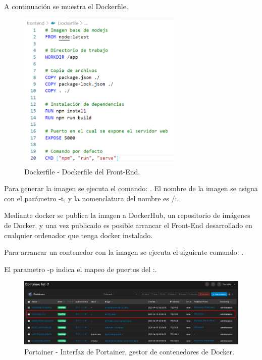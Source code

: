\bigskip

A continuación se muestra el Dockerfile.

\bigskip

\begin{figure}[H]
        \centering
        \includegraphics[width=0.7\textwidth]{img/capturas/Dockerfile.png}
        \caption{Dockerfile - Dockerfile del Front-End.}
        \label{fig:configApi}
\end{figure}

\bigskip

Para generar la imagen se ejecuta el comando: . El nombre de la imagen se asigna con el parámetro -t, y la nomenclatura del nombre es  /:.

\bigskip

Mediante docker se publica la imagen a DockerHub, un repositorio de imágenes de Docker, y una vez publicado es posible arrancar el Front-End desarrollado en cualquier ordenador que tenga docker instalado.

\bigskip

Para arrancar un contenedor con la imagen se ejecuta el siguiente comando: .

\bigskip

El parametro -p indica el mapeo de puertos del :.

\begin{figure}[H]
        \centering
        \includegraphics[width=1\textwidth]{img/capturas/portainertfg.png}
        \caption{Portainer - Interfaz de Portainer, gestor de contenedores de Docker.}
        \label{fig:configApi}
\end{figure}

